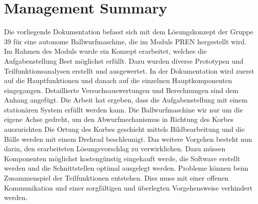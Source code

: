 \section{Management Summary}
Die vorliegende Dokumentation befasst sich mit dem Lösungskonzept der Gruppe 39 für eine autonome Ballwurfmaschine, die im Moduls PREN hergestellt wird. 
Im Rahmen des Moduls wurde ein Konzept erarbeitet, welches die Aufgabenstellung Best möglichst erfüllt. Dazu wurden diverse Prototypen und Teilfunktionsanalysen erstellt und ausgewertet. In der Dokumentation wird zuerst auf die Hauptfunktionen und danach auf die einzelnen Hauptkomponenten eingegangen. Detaillierte Versuchsauswertungen und Berechnungen sind dem Anhang angefügt.  
Die Arbeit hat ergeben, dass die Aufgabenstellung mit einem stationären System erfüllt werden kann. Die Ballwurfmaschine wir nur um die eigene Achse gedreht, um den Abwurfmechanismus in Richtung des Korbes auszurichten Die Ortung des Korbes geschieht mittels Bildbearbeitung und die Bälle werden mit einem Drehrad beschleunigt. 
Das weitere Vorgehen besteht nun darin, den erarbeiteten Lösungsvorschlag zu verwirklichen. Dazu müssen Komponenten möglichst kostengünstig eingekauft werde, die Software erstellt werden und die Schnittstellen optimal ausgelegt werden. Probleme können beim Zusammenspiel der Teilfunktionen entstehen. Dies muss mit einer offenen Kommunikation und einer sorgfältigen und überlegten Vorgehensweise verhindert werden. 
